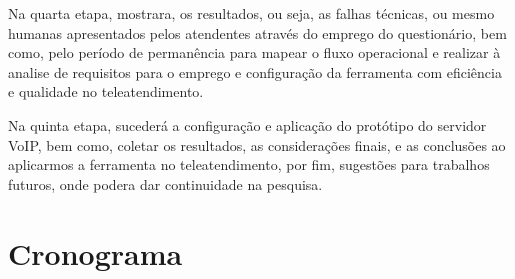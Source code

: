 	Na quarta etapa, mostrara, os resultados, ou seja, as falhas técnicas, ou mesmo humanas apresentados pelos atendentes através do emprego do questionário, bem como, pelo período de permanência para mapear o fluxo operacional e realizar à analise de requisitos para o emprego e configuração da ferramenta com eficiência e qualidade no teleatendimento.

	Na quinta etapa, sucederá a configuração e aplicação do protótipo do servidor VoIP, bem como, coletar os resultados, as considerações finais, e as conclusões  ao aplicarmos a ferramenta no teleatendimento, por fim, sugestões para trabalhos futuros, onde podera dar continuidade na pesquisa. 


\newpage
\section{Cronograma}
\thispagestyle{empty}

